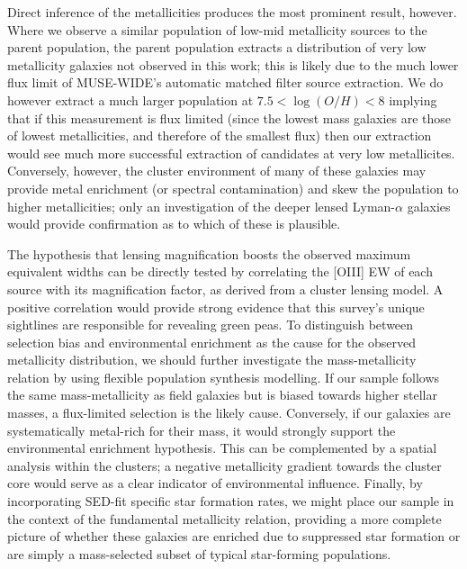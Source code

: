 \documentclass[fleqn,usenatbib]{mnras}
\begin{document}
Direct inference of the metallicities produces the most prominent result, however. Where we observe a similar population of low-mid metallicity sources to the parent population, the parent population extracts a distribution of very low metallicity galaxies not observed in this work; this is likely due to the much lower flux limit of MUSE-WIDE's automatic matched filter source extraction. We do however extract a much larger population at $7.5<\log(O/H)<8$ implying that if this measurement is flux limited (since the lowest mass galaxies are those of lowest metallicities, and therefore of the smallest flux) then our extraction would see much more successful extraction of candidates at very low metallicites. Conversely, however, the cluster environment of many of these galaxies may provide metal enrichment (or spectral contamination) and skew the population to higher metallicities; only an investigation of the deeper lensed Lyman-$\alpha$ galaxies would provide confirmation as to which of these is plausible.

The hypothesis that lensing magnification boosts the observed maximum equivalent widths can be directly tested by correlating the [OIII] EW of each source with its magnification factor, as derived from a cluster lensing model. A positive correlation would provide strong evidence that this survey's unique sightlines are responsible for revealing green peas. To distinguish between selection bias and environmental enrichment as the cause for the observed metallicity distribution, we should further investigate the mass-metallicity relation by using flexible population synthesis modelling. If our sample follows the same mass-metallicity as field galaxies but is biased towards higher stellar masses, a flux-limited selection is the likely cause. Conversely, if our galaxies are systematically metal-rich for their mass, it would strongly support the environmental enrichment hypothesis. This can be complemented by a spatial analysis within the clusters; a negative metallicity gradient towards the cluster core would serve as a clear indicator of environmental influence. Finally, by incorporating SED-fit specific star formation rates, we might place our sample in the context of the fundamental metallicity relation, providing a more complete picture of whether these galaxies are enriched due to suppressed star formation or are simply a mass-selected subset of typical star-forming populations.
\end{document}
